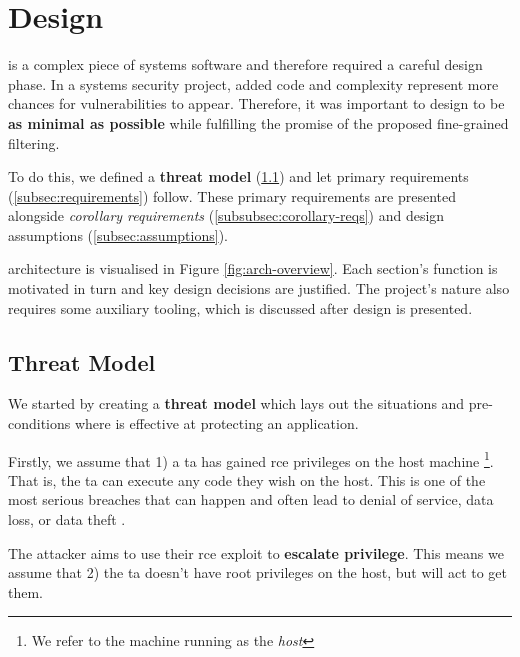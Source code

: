 \section{Design} \label{sec:design}

%
        

\af is a complex piece of systems software and therefore required a
careful design phase. In a systems security project, added code and complexity
represent more chances for vulnerabilities to appear. Therefore, it was
important to design \af to be \textbf{as minimal as possible} while fulfilling
the promise of the proposed fine-grained filtering.

To do this, we defined a \textbf{threat model} (\ref{subsec:threat-model}) and
let primary requirements (\ref{subsec:requirements}) follow. These primary
requirements are presented alongside \textit{corollary requirements}
(\ref{subsubsec:corollary-reqs}) and design assumptions
(\ref{subsec:assumptions}).

\afg architecture is visualised in Figure \ref{fig:arch-overview}. Each
section's function is motivated in turn and key design decisions are justified.
The project's nature also requires some auxiliary tooling, which is discussed
after \afg design is presented.

\subsection{Threat Model}\label{subsec:threat-model}

We started by creating a \textbf{threat model} which lays out the situations and
pre-conditions where \af is effective at protecting an application.

Firstly, we assume that 1) a \ac{ta} has gained \ac{rce} privileges on the host
machine \footnote{We refer to the machine running \af as the \textit{host
}}. That is, the \ac{ta} can execute any code they wish on the host. This is one of the most serious breaches that can happen and often
lead to denial of service, data loss, or data theft \cite{RCE_BAD}.

The attacker aims to use their \ac{rce} exploit to \textbf{escalate privilege}. This
means we assume that 2) the \ac{ta} doesn't have root privileges on the host,
but will act to get them.

